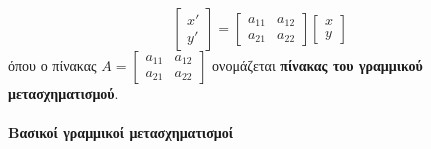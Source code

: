 \documentclass[twoside,10pt]{book}
\begin{document}
\[ \begin{bmatrix}
x'\\y'
\end{bmatrix}=\begin{bmatrix}
a_{11} & a_{12}\\a_{21} & a_{22}
\end{bmatrix}\begin{bmatrix}
x\\y
\end{bmatrix} \]
όπου ο πίνακας $ A=\begin{bmatrix}
a_{11} & a_{12}\\a_{21} & a_{22}
\end{bmatrix} $ ονομάζεται \textbf{πίνακας του γραμμικού μετασχηματισμού}.\\\\
\textbf{Βασικοί γραμμικοί μετασχηματισμοί}
\end{document}
